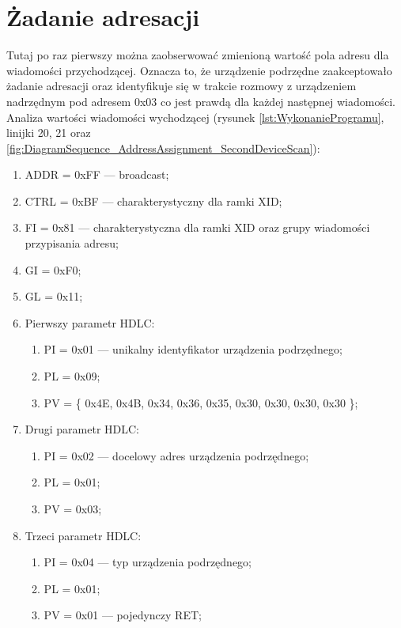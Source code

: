 \section{Żadanie adresacji}
Tutaj po raz pierwszy można zaobserwować zmienioną wartość pola adresu dla wiadomości
przychodzącej. Oznacza to, że urządzenie podrzędne zaakceptowało żadanie adresacji 
oraz identyfikuje się w trakcie rozmowy z urządzeniem nadrzędnym pod adresem 0x03 co
jest prawdą dla każdej następnej wiadomości.
\newline\newline
Analiza wartości wiadomości wychodzącej 
(rysunek \ref{lst:WykonanieProgramu}, linijki {20, 21} oraz \ref{fig:DiagramSequence_AddressAssignment_SecondDeviceScan}):
\begin{enumerate}
    \item ADDR = 0xFF --- broadcast;
    \item CTRL = 0xBF --- charakterystyczny dla ramki XID;
    \item FI = 0x81 --- charakterystyczna dla ramki XID oraz grupy wiadomości przypisania adresu;
    \item GI = 0xF0;
    \item GL = 0x11;
    \item Pierwszy parametr HDLC:
    \begin{enumerate}
        \item PI = 0x01 --- unikalny identyfikator urządzenia podrzędnego;
        \item PL = 0x09;
        \item PV = \{ 0x4E, 0x4B, 0x34, 0x36, 0x35, 0x30, 0x30, 0x30, 0x30 \};
    \end{enumerate}
    \item Drugi parametr HDLC:
    \begin{enumerate}
        \item PI = 0x02 --- docelowy adres urządzenia podrzędnego;
        \item PL = 0x01;
        \item PV = 0x03;
    \end{enumerate}
    \item Trzeci parametr HDLC:
    \begin{enumerate}
        \item PI = 0x04 --- typ urządzenia podrzędnego;
        \item PL = 0x01;
        \item PV = 0x01 --- pojedynczy RET;
    \end{enumerate}
\end{enumerate}
